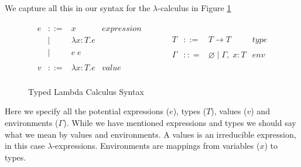 \documentclass[11pt
              , a4paper
              , twoside
              , openright
              ]{report}
\numberwithin{case}{theorem}
\numberwithin{subcase}{case}
\begin{document}
We capture all this in our syntax for the $\lambda$-calculus in Figure \ref{f:lambda_syntax}
\begin{figure}[t]
\[
\begin{array}{lll}
\begin{array}{lllr}
e & ::= & x & expression \\
& | & \lambda x : T. e &\\
& | & e \; e &\\
&&\\
v & ::= & \lambda x : T. e & value\\
 \end{array}
& ~~~~~~
&
\begin{array}{lllr}
T & ::= & T \rightarrow T & type \\
&&\\
\Gamma & :: = & \varnothing \; | \; \Gamma,\; x : T & env \\
\end{array}
\end{array}
\]
\caption{Typed Lambda Calculus Syntax}
\label{f:lambda_syntax}
\end{figure}
Here we specify all the potential expressions ($e$), types ($T$), values ($v$) and environments ($\Gamma$). While we have mentioned expressions and types we should say what we mean by values and environments. A values is an irreducible expression, in this case $\lambda$-expressions. Environments are mappings from variables ($x$) to types. 
\end{document}
